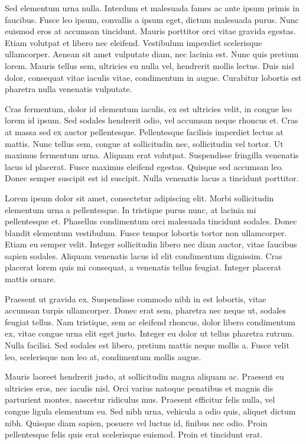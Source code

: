 \documentclass{homework}
\begin{document}
Sed elementum urna nulla. Interdum et malesuada fames ac ante ipsum primis in faucibus. Fusce leo ipsum, convallis a ipsum eget, dictum malesuada purus. Nunc euismod eros at accumsan tincidunt. Mauris porttitor orci vitae gravida egestas. Etiam volutpat et libero nec eleifend. Vestibulum imperdiet scelerisque ullamcorper. Aenean sit amet vulputate diam, nec lacinia est. Nunc quis pretium lorem. Mauris tellus sem, ultricies eu nulla vel, hendrerit mollis lectus. Duis nisl dolor, consequat vitae iaculis vitae, condimentum in augue. Curabitur lobortis est pharetra nulla venenatis vulputate.

Cras fermentum, dolor id elementum iaculis, ex est ultricies velit, in congue leo lorem id ipsum. Sed sodales hendrerit odio, vel accumsan neque rhoncus et. Cras at massa sed ex auctor pellentesque. Pellentesque facilisis imperdiet lectus at mattis. Nunc tellus sem, congue at sollicitudin nec, sollicitudin vel tortor. Ut maximus fermentum urna. Aliquam erat volutpat. Suspendisse fringilla venenatis lacus id placerat. Fusce maximus eleifend egestas. Quisque sed accumsan leo. Donec semper suscipit est id suscipit. Nulla venenatis lacus a tincidunt porttitor.

Lorem ipsum dolor sit amet, consectetur adipiscing elit. Morbi sollicitudin elementum urna a pellentesque. In tristique purus nunc, at lacinia mi pellentesque et. Phasellus condimentum orci malesuada tincidunt sodales. Donec blandit elementum vestibulum. Fusce tempor lobortis tortor non ullamcorper. Etiam eu semper velit. Integer sollicitudin libero nec diam auctor, vitae faucibus sapien sodales. Aliquam venenatis lacus id elit condimentum dignissim. Cras placerat lorem quis mi consequat, a venenatis tellus feugiat. Integer placerat mattis ornare.

Praesent ut gravida ex. Suspendisse commodo nibh in est lobortis, vitae accumsan turpis ullamcorper. Donec erat sem, pharetra nec neque ut, sodales feugiat tellus. Nam tristique, sem ac eleifend rhoncus, dolor libero condimentum ex, vitae congue urna elit eget justo. Integer eu dolor ut tellus pharetra rutrum. Nulla facilisi. Sed sodales est libero, pretium mattis neque mollis a. Fusce velit leo, scelerisque non leo at, condimentum mollis augue.

Mauris laoreet hendrerit justo, at sollicitudin magna aliquam ac. Praesent eu ultricies eros, nec iaculis nisl. Orci varius natoque penatibus et magnis dis parturient montes, nascetur ridiculus mus. Praesent efficitur felis nulla, vel congue ligula elementum eu. Sed nibh urna, vehicula a odio quis, aliquet dictum nibh. Quisque diam sapien, posuere vel luctus id, finibus nec odio. Proin pellentesque felis quis erat scelerisque euismod. Proin et tincidunt erat.
\end{document}
